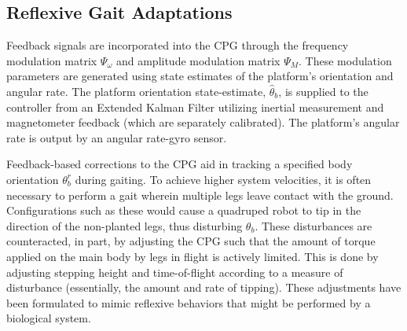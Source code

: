 		\subsection{Reflexive Gait Adaptations}

			Feedback signals are incorporated into the CPG through the frequency modulation matrix $\Psi_{\omega}$ and amplitude modulation matrix $\Psi_{M}$. These modulation parameters are generated using state estimates of the platform's orientation and angular rate. The platform orientation state-estimate, $\hat{\theta}_{b}$, is supplied to the controller from an Extended Kalman Filter utilizing inertial measurement and magnetometer feedback (which are separately calibrated). The platform's angular rate is output by an angular rate-gyro sensor.

			Feedback-based corrections to the CPG aid in tracking a specified body orientation $\theta_{b}^{r}$ during gaiting. To achieve higher system velocities, it is often necessary to perform a gait wherein multiple legs leave contact with the ground. Configurations such as these would cause a quadruped robot to tip in the direction of the non-planted legs, thus disturbing $\theta_{b}$. These disturbances are counteracted, in part, by adjusting the CPG such that the amount of torque applied on the main body by legs in flight is actively limited. This is done by adjusting stepping height and time-of-flight according to a measure of disturbance (essentially, the amount and rate of tipping). These adjustments have been formulated to mimic reflexive behaviors that might be performed by a biological system.


